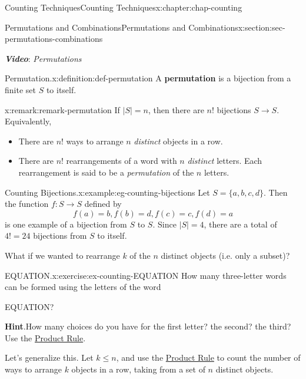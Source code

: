\documentclass[oneside,10pt,]{book}
\newcommand{\blocktitlefont}{\relax}
\newcommand{\alert}[1]{\textbf{\textit{#1}}}
\newcommand{\terminology}[1]{\textbf{#1}}
\numberwithin{equation}{section}
\begin{document}
\begin{chapterptx}{Counting Techniques}{}{Counting Techniques}{}{}{x:chapter:chap-counting}
\begin{sectionptx}{Permutations and Combinations}{}{Permutations and Combinations}{}{}{x:section:sec-permutations-combinations}
\begin{sidebyside}{1}{0}{0}{0}
\end{sidebyside}%
\par
\alert{Video}: \emph{Permutations}%
\begin{definition}{Permutation.}{x:definition:def-permutation}%
A \terminology{permutation} is a bijection from a finite set \(S\) to itself.%
\end{definition}
\begin{remark}{}{x:remark:remark-permutation}%
If \(|S| = n\), then there are \(n!\) bijections \(S \rightarrow S\). Equivalently,%
\begin{itemize}[label=\textbullet]
\item{}There are \(n!\) ways to arrange \(n\) \emph{distinct} objects in a row.%
\item{}There are \(n!\) rearrangements of a word with \(n\) \emph{distinct} letters. Each rearrangement is said to be a \emph{permutation} of the \(n\) letters.%
\end{itemize}
%
\end{remark}
\begin{example}{Counting Bijections.}{x:example:eg-counting-bijections}%
Let \(S = \{a,b,c,d\}\). Then the function \(f: S \rightarrow S\) defined by%
\begin{equation*}
f(a) = b, f(b) = d, f(c) = c, f(d) = a
\end{equation*}
is one example of a bijection from \(S\) to \(S\). Since \(|S| = 4\), there are a total of \(4! = 24\) bijections from \(S\) to itself.%
\end{example}
What if we wanted to rearrange \(k\) of the \(n\) distinct objects (i.e. only a subset)?%
\begin{inlineexercise}{EQUATION.}{x:exercise:ex-counting-EQUATION}%
How many three-letter words can be formed using the letters of the word%
\begin{sidebyside}{1}{0.4}{0.4}{0}%
\begin{sbspanel}{0.2}%
EQUATION?%
\end{sbspanel}%
\end{sidebyside}%
\par\smallskip%
\noindent\textbf{\blocktitlefont Hint}.\hypertarget{g:hint:id523925}{}\quad{}How many choices do you have for the first letter? the second? the third? Use the \hyperref[x:principle:prin-prod-rule]{Product Rule}.%
\end{inlineexercise}%
Let's generalize this. Let \(k \leq n\), and use the \hyperref[x:principle:prin-prod-rule]{Product Rule} to count the number of ways to arrange \(k\) objects in a row, taking from a set of \(n\) distinct objects.%

\end{sectionptx}
\end{chapterptx}
\end{document}
